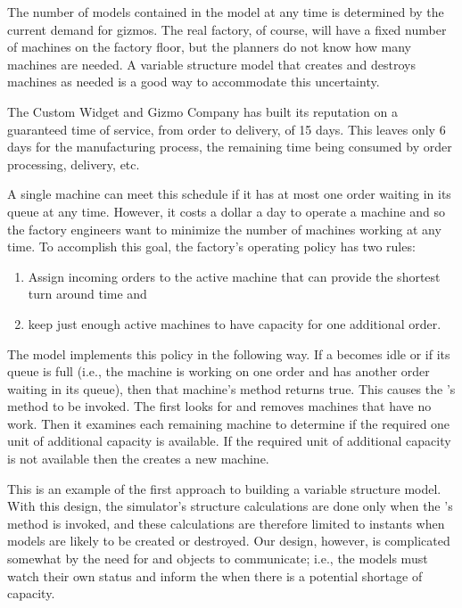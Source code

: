 The number of  models contained in the  model at any time is determined by the current demand for gizmos. The real factory, of course, will have a fixed number of machines on the factory floor, but the planners do not know how many machines are needed. A variable structure model that creates and destroys machines as needed is a good way to accommodate this uncertainty.

The Custom Widget and Gizmo Company has built its reputation on a guaranteed time of service, from order to delivery, of 15 days. This leaves only 6 days for the manufacturing process, the remaining time being consumed by order processing, delivery, etc.

A single machine can meet this schedule if it has at most one order waiting in its queue at any time. However, it costs a dollar a day to operate a machine and so the factory engineers want to minimize the number of machines working at any time. To accomplish this goal, the factory's operating policy has two rules:
\begin{enumerate}
\item Assign incoming orders to the active machine that can provide the shortest turn around time and
\item keep just enough active machines to have capacity for one additional order.
\end{enumerate}

The  model implements this policy in the following way. If a  becomes idle or if its queue is full (i.e., the machine is working on one order and has another order waiting in its queue), then that machine's  method returns true. This causes the 's  method to be invoked. The  first looks for and removes machines that have no work. Then it examines each remaining machine to determine if the required one unit of additional capacity is available. If the required unit of additional capacity is not available then the  creates a new machine.

This is an example of the first approach to building a variable structure model. With this design, the simulator's structure calculations are done only when the 's  method is invoked, and these calculations are therefore limited to instants when  models are likely to be created or destroyed. Our design, however, is complicated somewhat by the need for  and  objects to communicate; i.e., the  models must watch their own status and inform the  when there is a potential shortage of capacity.

